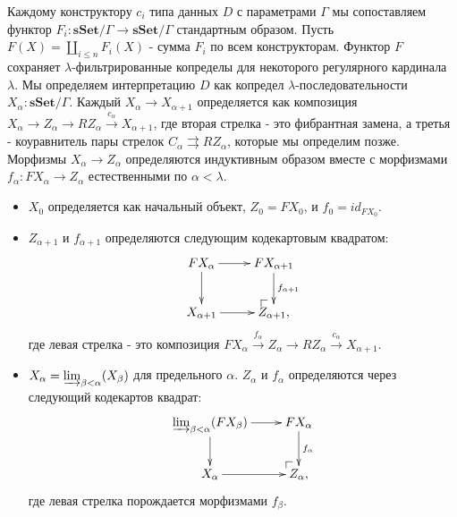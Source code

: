 \documentclass{amsart}
\makeatletter
\theoremstyle{definition}
\theoremstyle{remark}
\newcommand{\cat}[1]{\mathbf{#1}}
\newcommand{\sSet}{\cat{sSet}}
\numberwithin{figure}{section}
\newcommand{\po}[1][dr]{\save*!/#1+1.2pc/#1:(1,-1)@^{|-}\restore}
\makeatother
\begin{document}
Каждому конструктору $c_i$ типа данных $D$ с параметрами $\Gamma$ мы сопоставляем функтор $F_i : \sSet / \Gamma \to \sSet / \Gamma$ стандартным образом.
Пусть $F(X) = \coprod_{i \leq n} F_i(X)$ - сумма $F_i$ по всем конструкторам.
Функтор $F$ сохраняет $\lambda$-фильтрированные копределы для некоторого регулярного кардинала $\lambda$.
Мы определяем интерпретацию $D$ как копредел $\lambda$-последовательности $X_\alpha : \sSet / \Gamma$.
Каждый $X_\alpha \to X_{\alpha + 1}$ определяется как композиция $X_\alpha \to Z_\alpha \to R Z_\alpha \xrightarrow{c_\alpha} X_{\alpha + 1}$,
    где вторая стрелка - это фибрантная замена, а третья - коуравнитель пары стрелок $C_\alpha \rightrightarrows R Z_\alpha$, которые мы определим позже.
Морфизмы $X_\alpha \to Z_\alpha$ определяются индуктивным образом вместе с морфизмами $f_\alpha : F X_\alpha \to Z_\alpha$ естественными по $\alpha < \lambda$.
\begin{itemize}
\item $X_0$ определяется как начальный объект, $Z_0 = F X_0$, и $f_0 = id_{F X_0}$.
\item $Z_{\alpha + 1}$ и $f_{\alpha + 1}$ определяются следующим кодекартовым квадратом:
\[ \xymatrix{ F X_\alpha \ar[r] \ar[d] & F X_{\alpha + 1} \ar[d]^{f_{\alpha + 1}} \\
              X_{\alpha + 1} \ar[r]    & \po Z_{\alpha + 1},
            } \]
где левая стрелка - это композиция $F X_\alpha \xrightarrow{f_\alpha} Z_\alpha \to R Z_\alpha \xrightarrow{c_\alpha} X_{\alpha + 1}$.
\item $X_\alpha = \varinjlim_{\beta < \alpha} (X_\beta)$ для предельного $\alpha$.
$Z_\alpha$ и $f_\alpha$ определяются через следующий кодекартов квадрат:
\[ \xymatrix{ \varinjlim_{\beta < \alpha} (F X_\beta) \ar[r] \ar[d] & F X_\alpha \ar[d]^{f_\alpha} \\
              X_\alpha \ar[r]                                       & \po Z_\alpha,
            } \]
где левая стрелка порождается морфизмами $f_\beta$.
\end{itemize}
\end{document}
